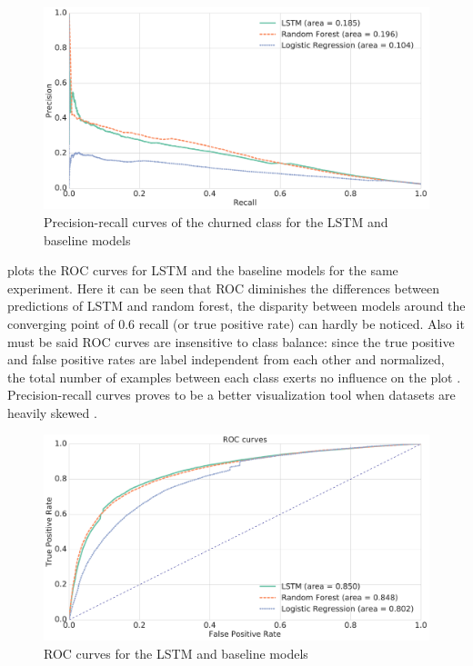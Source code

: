 \documentclass{kththesis}
\begin{document}
\begin{figure}[H]
    \centering
    \includegraphics[width=1.0\textwidth,keepaspectratio]{figures/prc_temporal_static.pdf}
    \caption{Precision-recall curves of the churned class for the LSTM and baseline models}
    \label{fig:prc_temporal_static}
\end{figure}

 plots the ROC curves for LSTM and the baseline models for the same experiment. Here it can be seen that ROC diminishes the differences between predictions of LSTM and random forest, the disparity between models around the converging point of $0.6$ recall (or true positive rate) can hardly be noticed. Also it must be said ROC curves are insensitive to class balance: since the true positive and false positive rates are label independent from each other and normalized, the total number of examples between each class exerts no influence on the plot \citep{fawcett2004roc}. Precision-recall curves proves to be a better visualization tool when datasets are heavily skewed \citep{saito2015precision}.

\begin{figure}[H]
    \centering
    \includegraphics[width=1.0\textwidth,keepaspectratio]{figures/roc_temporal_static.pdf}
    \caption{ROC curves for the LSTM and baseline models}
    \label{fig:roc_temporal_static}
\end{figure}
\end{document}
